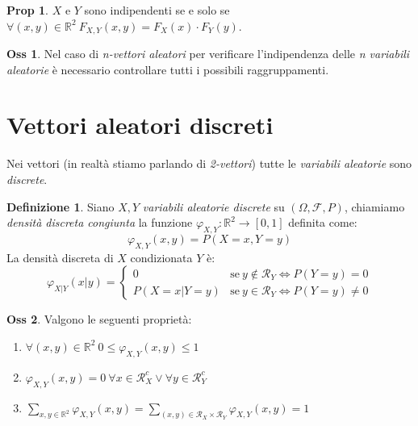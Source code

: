 \documentclass[12pt, a4paper]{report}
\theoremstyle{definition}
\newtheorem{definition}{Definizione}[section]
\newtheorem*{proposition}{Prop}
\newtheorem*{observation}{Oss}
\DeclareRobustCommand{\F}{\mathcal{F}}%
\DeclareRobustCommand{\R}{\mathbb{R}}%
\DeclareRobustCommand{\supp}{\mathcal{R}}%
\DeclareRobustCommand{\probspace}{(\Omega,\F,P)}
\begin{document}
\begin{proposition}
	$X$ e $Y$ sono indipendenti se e solo se \(\forall(x,y)\in\R^2\ F_{X,Y}(x,y)=
	F_X(x)\cdot F_Y(y)\).
\end{proposition}

\begin{observation}
	Nel caso di \emph{n-vettori aleatori} per verificare l'indipendenza delle
	\emph{n variabili aleatorie} è necessario controllare tutti i possibili
	raggruppamenti.
\end{observation}

\section{Vettori aleatori discreti}
Nei vettori (in realtà stiamo parlando di \emph{2-vettori}) tutte le \emph{variabili
aleatorie} sono \emph{discrete}.

\begin{definition}
	Siano $X,Y$ \emph{variabili aleatorie discrete} su $\probspace$, chiamiamo
	\emph{densità discreta congiunta} la funzione \(\varphi_{X,Y}:\R^2
	\rightarrow[0,1]\) definita come:
	\[\varphi_{X,Y}(x,y)=P(X=x,Y=y)\]
	La densità discreta di $X$ condizionata $Y$ è:
	\[\varphi_{X|Y}(x|y)=\begin{cases}
		{0} & \text{se}\ {y\notin\supp_Y\Leftrightarrow P(Y=y)=0}\\
		{P(X=x|Y=y)} & \text{se}\ {y\in\supp_Y\Leftrightarrow P(Y=y)\neq 0}
	\end{cases}\]
\end{definition}
\begin{observation}
	Valgono le seguenti proprietà:
	\begin{enumerate}[label=(\roman*)]
		\item \(\forall(x,y)\in\R^2\ 0\leq \varphi_{X,Y}(x,y)\leq 1\)
		\item \(\varphi_{X,Y}(x,y)=0\ \forall x\in\supp_X^c\vee\forall y\in\supp_Y^c\)
		\item \(\sum_{x,y\in\R^2}\varphi_{X,Y}(x,y)=\sum_{(x,y)\in\supp_X\times
		\supp_Y}\varphi_{X,Y}(x,y)=1\)
	\end{enumerate}
\end{observation}
\end{document}
